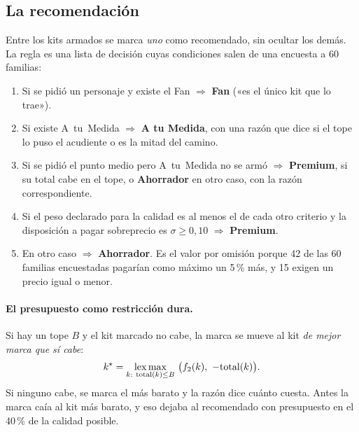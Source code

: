 \subsection{La recomendación}
\label{sec:opt-recomendar}

Entre los kits armados se marca \emph{uno} como recomendado, sin ocultar los
demás. La regla es una lista de decisión cuyas condiciones salen de una
encuesta a 60 familias:

\begin{enumerate}
  \item Si se pidió un personaje y existe el Fan $\Rightarrow$ \textbf{Fan}
        («es el único kit que lo trae»).
  \item Si existe A~tu~Medida $\Rightarrow$ \textbf{A tu Medida}, con una
        razón que dice si el tope lo puso el acudiente o es la mitad del camino.
  \item Si se pidió el punto medio pero A~tu~Medida no se armó
        $\Rightarrow$ \textbf{Premium}, si su total cabe en el tope, o
        \textbf{Ahorrador} en otro caso, con la razón correspondiente.
  \item Si el peso declarado para la calidad es al menos el de cada otro
        criterio y la disposición a pagar sobreprecio es $\sigma\geq0{,}10$
        $\Rightarrow$ \textbf{Premium}.
  \item En otro caso $\Rightarrow$ \textbf{Ahorrador}. Es el valor por
        omisión porque 42 de las 60 familias encuestadas pagarían como
        máximo un 5\,\% más, y 15 exigen un precio igual o menor.
\end{enumerate}

\paragraph{El presupuesto como restricción dura.} Si hay un tope $B$ y el kit
marcado no cabe, la marca se mueve al kit \emph{de mejor marca que sí cabe}:
\[
  k^\star=\lexmax_{k:\ \mathrm{total}(k)\leq B}\ \bigl(f_2(k),\ -\mathrm{total}(k)\bigr).
\]
Si ninguno cabe, se marca el más barato y la razón dice cuánto cuesta. Antes
la marca caía al kit más barato, y eso dejaba al recomendado con presupuesto en
el 40\,\% de la calidad posible.

